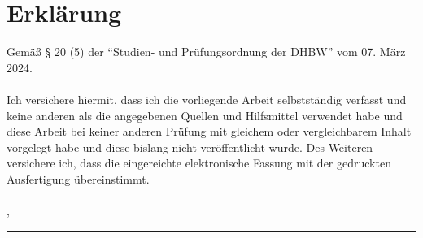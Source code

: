 
\chapter*{Erklärung}
Gemäß § 20 (5) der "`Studien- und Prüfungsordnung der DHBW"' vom 07. März 2024. \\
\\
Ich versichere hiermit, dass ich die vorliegende Arbeit selbstständig verfasst und keine anderen als die angegebenen Quellen und Hilfsmittel verwendet habe und diese Arbeit bei keiner anderen Prüfung mit gleichem oder vergleichbarem Inhalt vorgelegt habe und diese bislang nicht veröffentlicht wurde. Des Weiteren versichere ich, dass die eingereichte elektronische Fassung mit der gedruckten Ausfertigung übereinstimmt.\\
\\
\releaseLocation, \releaseDate
\vspace{2em}

\rule{6cm}{0.4pt}\\
\documentAuthor
